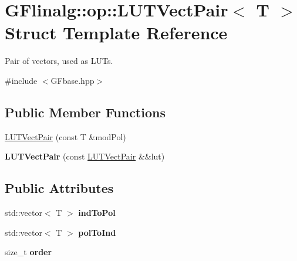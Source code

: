 \hypertarget{struct_g_flinalg_1_1op_1_1_l_u_t_vect_pair}{}\section{G\+Flinalg\+::op\+::L\+U\+T\+Vect\+Pair$<$ T $>$ Struct Template Reference}
\label{struct_g_flinalg_1_1op_1_1_l_u_t_vect_pair}


Pair of vectors, used as L\+U\+Ts.  




{\ttfamily \#include $<$G\+Fbase.\+hpp$>$}

\subsection*{Public Member Functions}
\begin{DoxyCompactItemize}
\item 
\mbox{\hyperlink{struct_g_flinalg_1_1op_1_1_l_u_t_vect_pair_aa64a1a5e5d701d8b612e8f0e190fcac4}{L\+U\+T\+Vect\+Pair}} (const T \&mod\+Pol)
\item 
\mbox{\label{struct_g_flinalg_1_1op_1_1_l_u_t_vect_pair_a206e64d038c696f43d3081494ce6424e}} 
{\bfseries L\+U\+T\+Vect\+Pair} (const \mbox{\hyperlink{struct_g_flinalg_1_1op_1_1_l_u_t_vect_pair}{L\+U\+T\+Vect\+Pair}} \&\&lut)
\end{DoxyCompactItemize}
\subsection*{Public Attributes}
\begin{DoxyCompactItemize}
\item 
\mbox{\label{struct_g_flinalg_1_1op_1_1_l_u_t_vect_pair_a9f62a387ed773d028da00bd72a1898ef}} 
std\+::vector$<$ T $>$ {\bfseries ind\+To\+Pol}
\item 
\mbox{\label{struct_g_flinalg_1_1op_1_1_l_u_t_vect_pair_a734c20444002055feb12247dca50cf1b}} 
std\+::vector$<$ T $>$ {\bfseries pol\+To\+Ind}
\item 
\mbox{\label{struct_g_flinalg_1_1op_1_1_l_u_t_vect_pair_a61d7552843e48759a7a10e22d6a333df}} 
size\+\_\+t {\bfseries order}
\end{DoxyCompactItemize}



